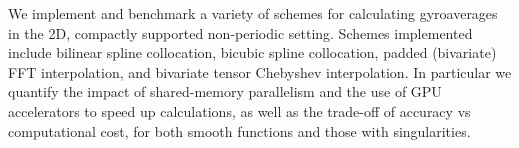 %

We implement and benchmark a variety of schemes for calculating gyroaverages in the 2D, compactly supported non-periodic setting.  Schemes implemented include bilinear spline collocation, bicubic spline collocation, padded (bivariate) FFT interpolation, and bivariate tensor Chebyshev interpolation. In particular we quantify the impact of shared-memory parallelism and the use of GPU accelerators to speed up calculations, as well as the trade-off of accuracy vs computational cost, for both smooth functions and those with singularities. 